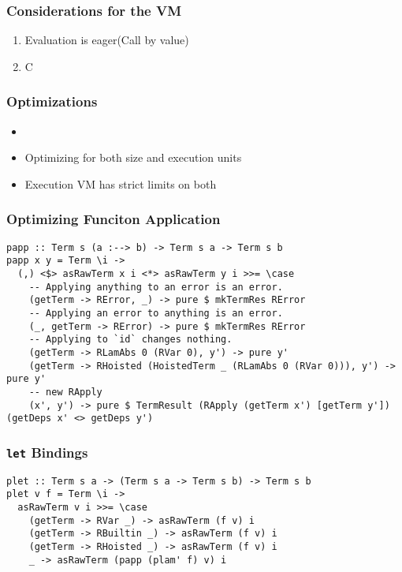 \documentclass{beamer}
\begin{document}
\begin{frame}
  \frametitle{Considerations for the VM}
  \begin{enumerate}
  \item
    Evaluation is eager(Call by value)
  \item
    C
  \end{enumerate}
\end{frame}

\begin{frame}
  \frametitle{Optimizations}
  \begin{itemize}
    \item
    \item Optimizing for both size and execution units
    \item Execution VM has strict limits on both
    \end{itemize}
\end{frame}

\begin{frame}
\frametitle{Optimizing Funciton Application}
\begin{verbatim}
papp :: Term s (a :--> b) -> Term s a -> Term s b
papp x y = Term \i ->
  (,) <$> asRawTerm x i <*> asRawTerm y i >>= \case
    -- Applying anything to an error is an error.
    (getTerm -> RError, _) -> pure $ mkTermRes RError
    -- Applying an error to anything is an error.
    (_, getTerm -> RError) -> pure $ mkTermRes RError
    -- Applying to `id` changes nothing.
    (getTerm -> RLamAbs 0 (RVar 0), y') -> pure y'
    (getTerm -> RHoisted (HoistedTerm _ (RLamAbs 0 (RVar 0))), y') -> pure y'
    -- new RApply
    (x', y') -> pure $ TermResult (RApply (getTerm x') [getTerm y']) (getDeps x' <> getDeps y')
\end{verbatim}
\end{frame}

\begin{frame}
  \frametitle{\verb|let| Bindings}
\begin{verbatim}
plet :: Term s a -> (Term s a -> Term s b) -> Term s b
plet v f = Term \i ->
  asRawTerm v i >>= \case
    (getTerm -> RVar _) -> asRawTerm (f v) i
    (getTerm -> RBuiltin _) -> asRawTerm (f v) i
    (getTerm -> RHoisted _) -> asRawTerm (f v) i
    _ -> asRawTerm (papp (plam' f) v) i
\end{verbatim}
\end{frame}
\end{document}
